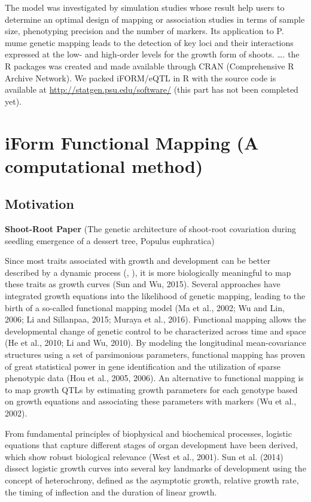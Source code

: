 \documentclass[]{book}
\theoremstyle{definition}
\theoremstyle{definition}
\theoremstyle{remark}
\begin{document}
The model was investigated by simulation studies whose result help users
to determine an optimal design of mapping or association studies in
terms of sample size, phenotyping precision and the number of markers.
Its application to P. mume genetic mapping leads to the detection of key
loci and their interactions expressed at the low- and high-order levels
for the growth form of shoots. \ldots{}. the R packages was created and
made available through CRAN (Comprehensive R Archive Network). We packed
iFORM/eQTL in R with the source code is available at
\url{http://statgen.psu.edu/software/} (this part has not been completed
yet).

\chapter{iForm Functional Mapping (A computational
method)}\label{iform-functional-mapping-a-computational-method}

\section{Motivation}\label{motivation-2}

\textbf{Shoot-Root Paper} (The genetic architecture of shoot-root
covariation during seedling emergence of a dessert tree, Populus
euphratica)

Since most traits associated with growth and development can be better
described by a dynamic process (\cite{hernandez2015understanding},
\cite{muraya2017genetic}), it is more biologically meaningful to map
these traits as growth curves (Sun and Wu, 2015). Several approaches
have integrated growth equations into the likelihood of genetic mapping,
leading to the birth of a so-called functional mapping model (Ma et al.,
2002; Wu and Lin, 2006; Li and Sillanpaa, 2015; Muraya et al., 2016).
Functional mapping allows the developmental change of genetic control to
be characterized across time and space (He et al., 2010; Li and Wu,
2010). By modeling the longitudinal mean-covariance structures using a
set of parsimonious parameters, functional mapping has proven of great
statistical power in gene identification and the utilization of sparse
phenotypic data (Hou et al., 2005, 2006). An alternative to functional
mapping is to map growth QTLs by estimating growth parameters for each
genotype based on growth equations and associating these parameters with
markers (Wu et al., 2002).

From fundamental principles of biophysical and biochemical processes,
logistic equations that capture different stages of organ development
have been derived, which show robust biological relevance (West et al.,
2001). Sun et al. (2014) dissect logistic growth curves into several key
landmarks of development using the concept of heterochrony, defined as
the asymptotic growth, relative growth rate, the timing of inflection
and the duration of linear growth.
\end{document}
